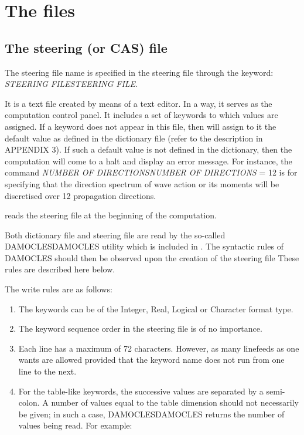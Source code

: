 \section{ The files}


\subsection{ The steering (or CAS) file}

 The steering file name is specified in the steering file through the keyword: \textit{STEERING FILESTEERING FILE.}

 It is a text file created by means of a text editor. In a way, it serves as the computation control panel. It includes a set of keywords to which values are assigned. If a keyword does not appear in this file, then \tomawac will assign to it the default value as defined in the dictionary file (refer to the description in APPENDIX 3). If such a default value is not defined in the dictionary, then the computation will come to a halt and display an error message. For instance, the command \textit{NUMBER OF DIRECTIONSNUMBER OF DIRECTIONS} = 12 is for specifying that the direction spectrum of wave action or its moments will be discretised over 12 propagation directions.

 \tomawac reads the steering file at the beginning of the computation.

 Both dictionary file and steering file are read by the so-called DAMOCLESDAMOCLES utility which is included in \tomawac. The syntactic rules of DAMOCLES should then be observed upon the creation of the steering file These rules are described here below.

 The write rules are as follows:

\begin{enumerate}
\item  The keywords can be of the Integer, Real, Logical or Character format type.

\item  The keyword sequence order in the steering file is of no importance.

\item  Each line has a maximum of 72 characters. However, as many linefeeds as one wants are allowed provided that the keyword name does not run from one line to the next.

\item  For the table-like keywords, the successive values are separated by a semi-colon. A number of values equal to the table dimension should not necessarily be given; in such a case, DAMOCLESDAMOCLES returns the number of values being read. For example:
\end{enumerate}

